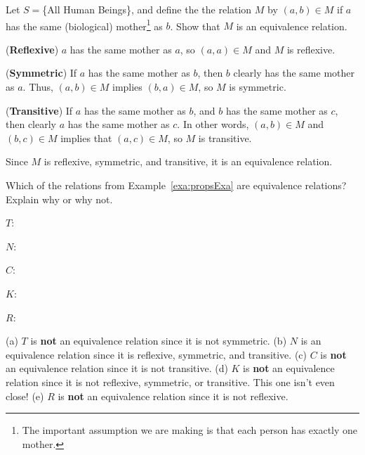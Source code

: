 \begin{exa}
Let $S = $\{All Human Beings\}, and define 
the the relation $M$ by $(a,b)\in M$ if $a$ has the same (biological) 
mother\footnote{The important assumption we are making is that each person has exactly one mother.}
 as $b$.
Show that $M$ is an equivalence relation.
\begin{pf}
({\bf Reflexive}) 
$a$ has the same mother as $a$, 
so $(a,a)\in M$ and 
$M$ is reflexive.

\noindent
({\bf Symmetric})
If $a$ has the same mother as $b$, then $b$ clearly has the same mother as $a$.
Thus, $(a,b)\in M$ implies $(b,a)\in M$, so $M$ is symmetric.

\noindent
({\bf Transitive})
If $a$ has the same mother as $b$, and $b$ has the same mother as $c$, 
then clearly $a$ has the same mother as $c$.  In other words, $(a,b)\in M$ and
$(b,c)\in M$ implies that $(a,c)\in M$, so $M$ is transitive.

\noindent
Since $M$ is reflexive, symmetric, and transitive, it is an equivalence relation.
\end{pf}
\end{exa}

\begin{exer}
Which of the relations from Example~\ref{exa:propsExa} are equivalence relations?  Explain why or why not.
\begin{lenum}
\item $T$: \blanklinefill  

\blanklinefill
\item $N$: \blanklinefill 

\blanklinefill
\item $C$: \blanklinefill

\blanklinefill
\item $K$: \blanklinefill

\blanklinefill
\item $R$: \blanklinefill

\blanklinefill
\end{lenum}
\begin{answer}
(a) $T$ is {\bf not} an equivalence relation since it is not symmetric.
(b) $N$ is an equivalence relation since it is reflexive, symmetric, and transitive. 
(c) $C$ is {\bf not} an equivalence relation since it is not transitive.
(d) $K$ is {\bf not} an equivalence relation since it is not reflexive, symmetric, or transitive.  
This one isn't even close!
(e) $R$ is {\bf not} an equivalence relation since it is not reflexive. 
\end{answer}
\end{exer}

